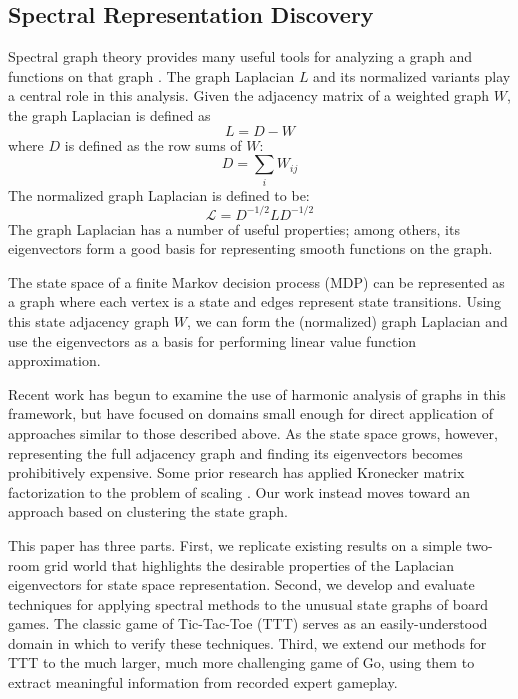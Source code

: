 \subsection{Spectral Representation Discovery}

Spectral graph theory provides many useful tools for analyzing a graph and
functions on that graph \citep{Chung1997Spectral}. The graph Laplacian $L$ and
its normalized variants play a central role in this analysis. Given the
adjacency matrix of a weighted graph $W$, the graph Laplacian is defined as
%
\begin{equation}
L = D-W
\end{equation}
%
where $D$ is defined as the row sums of $W$:
%
\begin{equation}
D = \sum_{i} W_{ij}
\end{equation}
%
The normalized graph Laplacian is defined to be:
%
\begin{equation}
\mathcal{L} = D^{-1/2}LD^{-1/2}
\label{eqn:norm.laplacian}
\end{equation}
%
The graph Laplacian has a number of useful properties; among others, its
eigenvectors form a good basis for representing smooth functions on the graph.

The state space of a finite Markov decision process (MDP) can be represented
as a graph where each vertex is a state and edges represent state transitions.
Using this state adjacency graph $W$, we can form the (normalized) graph 
Laplacian and use the eigenvectors as a basis for performing linear value 
function approximation.

Recent work
\citep{petrik2007analysis,mahadevan2006learning,Mahadevan2006Value,mahadevan2007proto}
has begun to examine the use of harmonic analysis of graphs in this framework,
but have focused on domains small enough for direct application of approaches
similar to those described above. As the state space grows, however,
representing the full adjacency graph and finding its eigenvectors becomes
prohibitively expensive. Some prior research has applied Kronecker matrix
factorization to the problem of scaling \citep{johns2007compact}. Our work
instead moves toward an approach based on clustering the state graph.

This paper has three parts. First, we replicate existing results on a simple
two-room grid world that highlights the desirable properties of the Laplacian
eigenvectors for state space representation. Second, we develop and evaluate
techniques for applying spectral methods to the unusual state graphs of board
games. The classic game of Tic-Tac-Toe (TTT) serves as an easily-understood
domain in which to verify these techniques. Third, we extend our methods for
TTT to the much larger, much more challenging game of Go, using them to extract
meaningful information from recorded expert gameplay.

